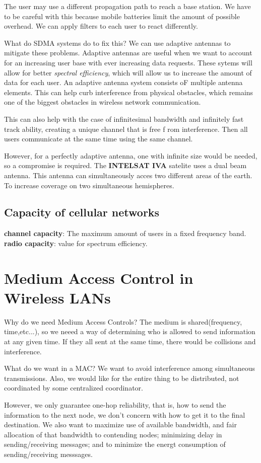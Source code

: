 \documentclass{article}
\begin{document}
The user may use a different propagation path to reach a base station. We have to be careful with this
because mobile batteries limit the amount of possible overhead. We can apply filters to each user to react
differently.

What do SDMA systems do to fix this? We can use adaptive antennas to mitigate these problems. Adaptive antennas 
are useful when we want to account for an increasing user base with ever increasing data requests. These sytems
will allow for better \textit{spectral efficiency}, which will allow us to increase the amount of data for each user.
An adaptive antenna system consists oF multiple antenna elements.
This can help curb interference from physical obstacles, which remains one of the biggest obstacles in wireless network
communication.

This can also help with the case of infinitesimal bandwidth and infinitely fast track ability, creating a unique channel that is free f
rom interference. Then all users communicate at the same time using the same channel.

However, for a perfectly adaptive antenna, one with infinite size would be needed, so a compromise is required. The 
\textbf{INTELSAT IVA} satelite uses a dual beam antenna. This antenna can simultaneously acces two different areas of 
the earth. To increase coverage on two simultaneous hemispheres.
\subsection{Capacity of cellular networks}
\textbf{channel capacity}: The maximum amount of users in a fixed frequency band.
\textbf{radio capacity}: value for spectrum efficiency. 
\section{Medium Access Control in Wireless LANs}
Why do we need Medium Access Controls? The medium is shared(frequency, time,etc...), so we neeed a way of 
determining who is allowed to send information at any given time. If they all sent at  the same time, there
would be collisions and interference. 

What do we want in a MAC? We want to avoid interference among simultaneous transmissions. Also, we would like 
for the entire thing to be distributed, not coordinated by some centralized coordinator.

However, we only guarantee one-hop reliability, that is, how to send the information to the next node, we don't 
concern with how to get it to the final destination. We also want to maximize use of available bandwidth, and fair
allocation of that bandwidth to contending nodes; minimizing delay in sending/receiving messages; and to minimize the
energt consumption of sending/receiving messsages.
\end{document}
